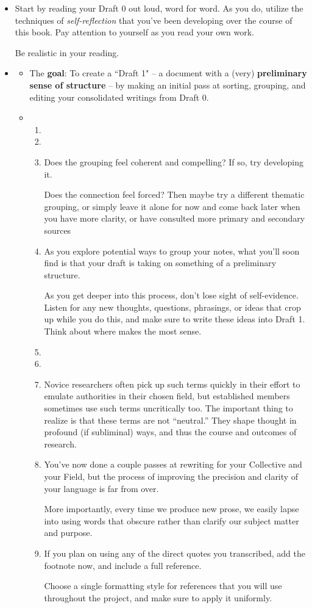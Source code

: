 \documentclass[11pt]{article}
\begin{document}
\begin{itemize}
\item Start by reading your Draft 0 out loud, word for word. As you do, utilize the techniques of \emph{self-reflection} that you’ve been developing over the course of this book. Pay attention to yourself as you read your own work. 

Be realistic in your reading. 

\item \begin{exercise}
\begin{itemize}
\item The \textbf{goal}: To create a ``Draft 1" -- a document with a (very) \textbf{preliminary sense of structure} -- by making an initial pass at sorting, grouping, and editing your consolidated writings from Draft 0.

\item 
\begin{enumerate}
\item 
\item 
\item  Does the grouping feel coherent and compelling? If so, try developing it.

Does the connection feel forced? Then maybe try a different thematic grouping, or simply leave it alone for now and come back later when you have more clarity, or have consulted more primary and secondary sources
\item As you explore potential ways to group your notes, what you'll soon find is that your draft is taking on something of a preliminary structure. 

As you get deeper into this process, don’t lose sight of self-evidence. Listen for any new thoughts, questions, phrasings, or ideas that
crop up while you do this, and make sure to write these ideas into Draft 1. Think about where makes the most sense. 
\item 
\item 
\item Novice researchers often pick up such terms quickly in their effort to emulate authorities in their chosen field, but established members sometimes use such terms uncritically too. The important thing to realize is that these terms are not “neutral.” They shape thought in profound (if subliminal) ways, and thus the course and outcomes of research.
\item You’ve now done a couple passes at rewriting for your Collective and your Field, but the process of improving the precision and clarity of your language is far from over. 

More importantly, every time we produce new prose, we easily lapse into using words that obscure rather than clarify our subject matter and purpose. 
\item If you plan on using any of the direct quotes you transcribed, add the footnote now, and include a full reference. 

Choose a single formatting style for references that you will use throughout the project, and make sure to apply it uniformly. 
\end{enumerate}
\end{itemize}
\end{exercise}
\end{itemize}
\end{document}
